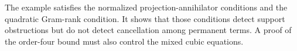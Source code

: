 The example satisfies the normalized projection-annihilator conditions and the
quadratic Gram-rank condition.  It shows that those conditions detect support
obstructions but do not detect cancellation among permanent terms.  A proof of
the order-four bound must also control the mixed cubic equations.

